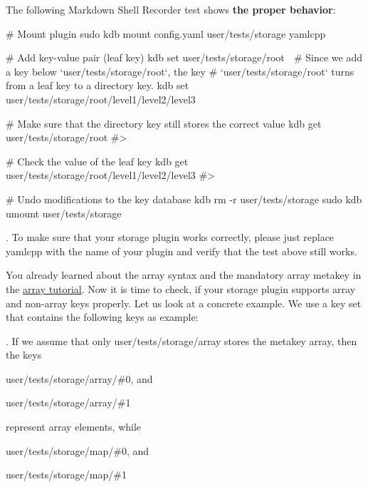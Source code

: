 The following Markdown Shell Recorder test shows {\bfseries the proper behavior}\+:


\begin{DoxyCode}
# Mount plugin
sudo kdb mount config.yaml user/tests/storage yamlcpp

# Add key-value pair (leaf key)
kdb set user/tests/storage/root 🐓
# Since we add a key below `user/tests/storage/root`, the key
# `user/tests/storage/root` turns from a leaf key to a directory key.
kdb set user/tests/storage/root/level1/level2/level3 🐣

# Make sure that the directory key still stores the correct value
kdb get user/tests/storage/root
#> 🐓

# Check the value of the leaf key
kdb get user/tests/storage/root/level1/level2/level3
#> 🐣

# Undo modifications to the key database
kdb rm -r user/tests/storage
sudo kdb umount user/tests/storage
\end{DoxyCode}


. To make sure that your storage plugin works correctly, please just replace {\ttfamily yamlcpp} with the name of your plugin and verify that the test above still works.

You already learned about the array syntax and the mandatory {\ttfamily array} metakey in the \hyperlink{doc_tutorials_arrays_md}{array tutorial}. Now it is time to check, if your storage plugin supports array and non-\/array keys properly. Let us look at a concrete example. We use a key set that contains the following keys as example\+:




. If we assume that only {\ttfamily user/tests/storage/array} stores the metakey {\ttfamily array}, then the keys


\begin{DoxyItemize}
\item {\ttfamily user/tests/storage/array/\#0}, and
\item {\ttfamily user/tests/storage/array/\#1}
\end{DoxyItemize}

represent array elements, while


\begin{DoxyItemize}
\item {\ttfamily user/tests/storage/map/\#0}, and
\item {\ttfamily user/tests/storage/map/\#1}
\end{DoxyItemize}

